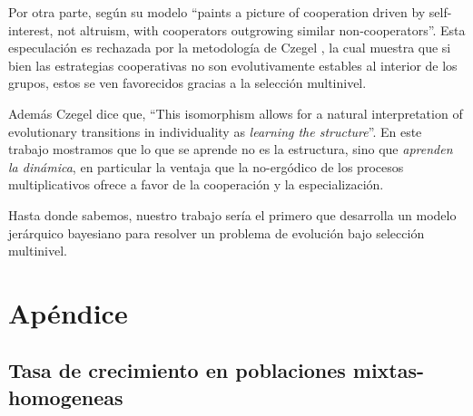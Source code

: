 \documentclass[a4paper,10pt]{article}
\begin{document}
Por otra parte, según \cite{peters-cooperation2019.03.04} su modelo ``paints a picture of cooperation driven by self-interest, not altruism, with cooperators outgrowing similar non-cooperators''.
Esta especulación es rechazada por la metodología de Czegel \cite{czegel2019-bayesianEvolution}, la cual muestra que si bien las estrategias cooperativas no son evolutivamente estables al interior de los grupos, estos se ven favorecidos gracias a la selección multinivel.

Además Czegel \cite{czegel2019-bayesianEvolution} dice que, ``This isomorphism allows for a natural interpretation of evolutionary transitions in individuality as \emph{learning the structure}''.
En este trabajo mostramos que lo que se aprende no es la estructura, sino que \emph{aprenden la dinámica}, en particular la ventaja que la no-ergódico de los procesos multiplicativos ofrece a favor de la cooperación y la especialización.


Hasta donde sabemos, nuestro trabajo sería el primero que desarrolla un modelo jerárquico bayesiano para resolver un problema de evolución bajo selección multinivel.



{\footnotesize


}

\section{Apéndice}

\subsection{Tasa de crecimiento en poblaciones mixtas-homogeneas}
\end{document}
